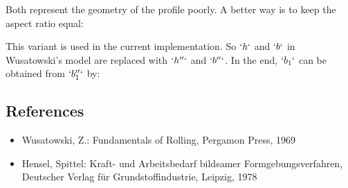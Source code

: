 Both represent the geometry of the profile poorly. A better way is to
keep the aspect ratio equal:

\begin{Shaded}
\begin{Highlighting}[]
\end{Highlighting}
\end{Shaded}

\begin{Shaded}
\begin{Highlighting}[]
\end{Highlighting}
\end{Shaded}

This variant is used in the current implementation. So \(`h`\) and
\(`b`\) in Wusatowski's model are replaced with \(`h''`\) and \(`b''`\).
In the end, \(`b_1`\) can be obtained from \(`b_1''`\) by:

\begin{Shaded}
\begin{Highlighting}[]
\end{Highlighting}
\end{Shaded}

\hypertarget{references}{%
\subsection{References}\label{references}}

\begin{itemize}
\tightlist
\item
  Wusatowski, Z.: Fundamentals of Rolling, Pergamon Press, 1969
\item
  Hensel, Spittel: Kraft- und Arbeitsbedarf bildsamer
  Formgebungsverfahren, Deutscher Verlag für Grundstoffindustrie,
  Leipzig, 1978
\end{itemize}
